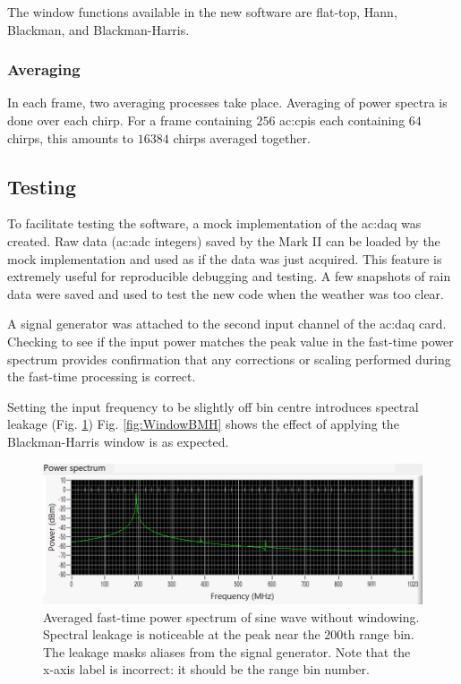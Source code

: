 \documentclass{article}
\begin{document}
The window functions available in the new software are flat-top, Hann, Blackman, and Blackman-Harris.

\subsubsection{Averaging}
In each frame, two averaging processes take place. Averaging of power spectra is done over each chirp. For a frame containing \(256\) \acrshort{ac:cpi}s each containing \(64\) chirps, this amounts to \(16384\) chirps averaged together. 

\subsection{Testing}
To facilitate testing the software, a mock implementation of the \acrshort{ac:daq} was created. Raw data (\acrshort{ac:adc} integers) saved by the Mark II can be loaded by the mock implementation and used as if the data was just acquired. This feature is extremely useful for reproducible debugging and testing. A few snapshots of rain data were saved and used to test the new code when the weather was too clear.

A signal generator was attached to the second input channel of the \acrshort{ac:daq} card. Checking to see if the input power matches the peak value in the fast-time power spectrum provides confirmation that any corrections or scaling performed during the fast-time processing is correct.

Setting the input frequency to be slightly off bin centre introduces spectral leakage (Fig. \ref{fig:WindowNone}) Fig. \ref{fig:WindowBMH} shows the effect of applying the Blackman-Harris window is as expected.

\begin{figure}[h]
	\centering
	\includegraphics[width=\textwidth]{window-none}
	\caption{Averaged fast-time power spectrum of sine wave without windowing. Spectral leakage is noticeable at the peak near the \(200\)th range bin. The leakage masks aliases from the signal generator. Note that the x-axis label is incorrect: it should be the range bin number.}
	\label{fig:WindowNone}
\end{figure}
\end{document}
